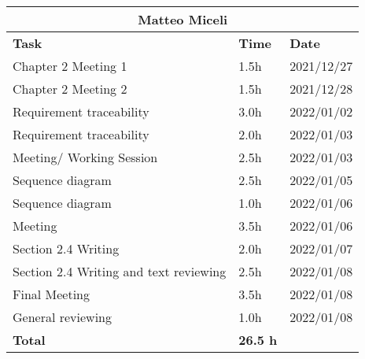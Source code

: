 \begin{table}[H]
\centering
\begin{tabular}{|p{}|p{}|p{}|}
\hline
\multicolumn{3}{|c|}{\textbf{Matteo Miceli}}            \\ \hline
\textbf{Task}                   & \textbf{Time} & \textbf{Date} \\ \hline

Chapter 2 Meeting 1				&		1.5h	   &	2021/12/27 \\ \hline
Chapter 2 Meeting 2				&		1.5h	   &	2021/12/28 \\ \hline
Requirement traceability		&		3.0h	   &	2022/01/02 \\ \hline
Requirement traceability		&		2.0h	   &	2022/01/03 \\ \hline
Meeting/ Working Session 	& 2.5h 	& 2022/01/03\\\hline
Sequence diagram 				&		2.5h	   &	2022/01/05 \\ \hline
Sequence diagram 				&		1.0h	   &	2022/01/06 \\ \hline
Meeting							&		3.5h	   &	2022/01/06 \\ \hline
Section 2.4 Writing			&		2.0h	   &	2022/01/07 \\ \hline
Section 2.4 Writing and text reviewing		 	&		2.5h	   &	2022/01/08 \\ \hline
Final Meeting					&		3.5h	   &	2022/01/08 \\ \hline
General reviewing 		&  1.0h & 2022/01/08 \\ \hline

\textbf{Total}                  		&  \textbf{26.5 h}   & \\ \hline
\end{tabular}
\end{table}

